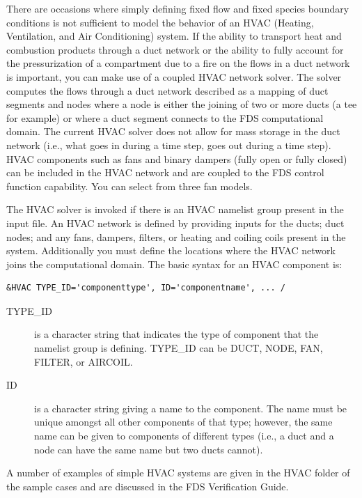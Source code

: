 \documentclass[11pt]{book}
\begin{document}
There are occasions where simply defining fixed flow and fixed species boundary conditions is not sufficient to model the behavior of an HVAC (Heating, Ventilation, and Air Conditioning) system.
If the ability to transport heat and combustion products through a duct network or the ability to fully account for the pressurization of a compartment
due to a fire on the flows in a duct network is important, you can make use of a coupled HVAC network solver.  The solver computes the flows through a
duct network described as a mapping of duct segments and nodes where a node is either the joining of two or more ducts (a tee for example) or where a duct segment connects to the FDS computational domain.
The current HVAC solver does not allow for mass storage in the duct network (i.e., what goes in during a time step, goes out during a time step).
HVAC components such as fans and binary dampers (fully open or fully closed) can be included in the HVAC network and are coupled to the FDS control function capability.  You can select from three fan models.

The HVAC solver is invoked if there is an {\ct HVAC} namelist group present in the input file.
An HVAC network is defined by providing inputs for the ducts; duct nodes; and any fans, dampers, filters, or heating and coiling coils present in the system.
Additionally you must define the locations where the HVAC network joins the computational domain.  The basic syntax for an {\ct HVAC} component is:

\begin{lstlisting}
&HVAC TYPE_ID='componenttype', ID='componentname', ... /
\end{lstlisting}


\begin{description}
\item[{\ct TYPE\_ID}] is a character string that indicates the type of component that the namelist group is defining.   {\ct TYPE\_ID} can be {\ct DUCT}, {\ct NODE}, {\ct FAN}, {\ct FILTER}, or {\ct AIRCOIL}.
\item[{\ct ID}] is a character string giving a name to the component.  The name must be unique amongst all other components of that type; however, the same name can be given to components of different types (i.e., a duct and a node can have the same name but two ducts cannot).
\end{description}
A number of examples of simple HVAC systems are given in the HVAC folder of the sample cases and are discussed in the FDS Verification Guide.
\end{document}
